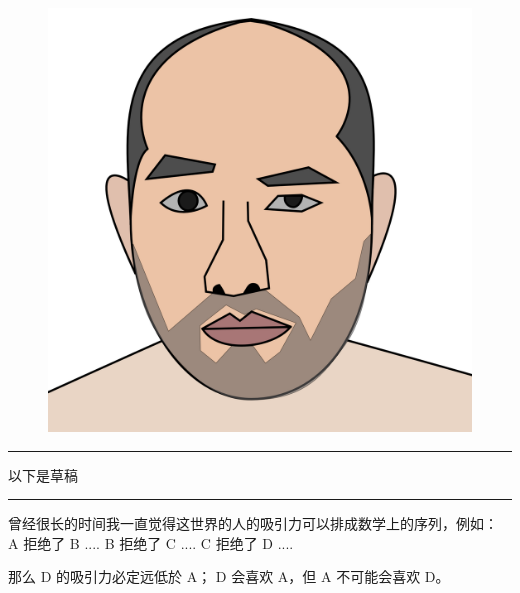 \documentclass[12pt]{report}
\newcommand{\cc}[2]{#1}
\newcommand{\cc}[2]{#2}
\newcommand{\tab}{\hspace*{1cm}}
\newcommand*\todo{\begin{center}\color{red}  \rule{5cm}{0.5pt} 以下是草稿\, \rule{5cm}{0.5pt} \end{center}}
\begin{document}
\begin{figure}[H]
\centering
\includegraphics[scale=0.3]{self-portrait.png}
\end{figure}

\todo

\cc{
曾经很长的时间我一直觉得这世界的人的吸引力可以排成数学上的序列，例如： \\
\tab \tab \tab A 拒绝了 B .... B 拒绝了 C .... C 拒绝了 D .... 
}{
	
}
\begin{center}
\end{center}
\cc{
那么 D 的吸引力必定远低於 A； D 会喜欢 A，但 A 不可能会喜欢 D。
}{
	
}

\begin{center}
\end{center}
\end{document}
